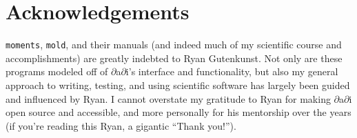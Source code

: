 \documentclass[11pt]{article}
\makeatletter
\newcommand{\dadi}{$\partial$a$\partial$i\xspace}
\newcommand{\mold}{\texttt{mold}\xspace}
\newcommand{\py}[1]{\lstinline[breaklines=true,language=Python, showstringspaces=False]@#1@}
\makeatother
\begin{document}
\section{Acknowledgements}
\py{moments}, \mold, and their manuals (and indeed much of my scientific course and accomplishments) are greatly indebted to Ryan Gutenkunst.
Not only are these programs modeled off of \dadi's interface and functionality, but also my general approach to writing, testing, and using scientific software has largely been guided and influenced by Ryan.
I cannot overstate my gratitude to Ryan for making \dadi open source and accessible, and more personally for his mentorship over the years (if you're reading this Ryan, a gigantic ``Thank you!'').





\end{document}
